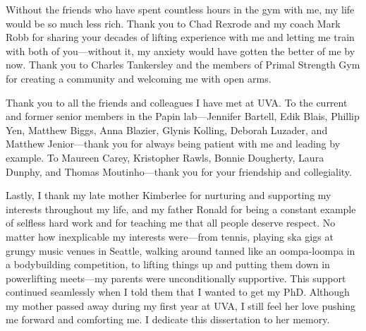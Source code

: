 \documentclass[11pt,onecolumn,notitlepage,openany,twoside]{book}
\begin{document}
Without the friends who have spent countless hours in the gym with me, my life would be so much less rich. Thank you to Chad Rexrode and my coach Mark Robb for sharing your decades of lifting experience with me and letting me train with both of you---without it, my anxiety would have gotten the better of me by now. Thank you to Charles Tankersley and the members of Primal Strength Gym for creating a community and welcoming me with open arms.

Thank you to all the friends and colleagues I have met at UVA. To the current and former senior members in the Papin lab---Jennifer Bartell, Edik Blais, Phillip Yen, Matthew Biggs, Anna Blazier, Glynis Kolling, Deborah Luzader, and Matthew Jenior---thank you for always being patient with me and leading by example. To Maureen Carey, Kristopher Rawls, Bonnie Dougherty, Laura Dunphy, and Thomas Moutinho---thank you for your friendship and collegiality.

Lastly, I thank my late mother Kimberlee for nurturing and supporting my interests throughout my life, and my father Ronald for being a constant example of selfless hard work and for teaching me that all people deserve respect. No matter how inexplicable my interests were---from tennis, playing ska gigs at grungy music venues in Seattle, walking around tanned like an oompa-loompa in a bodybuilding competition, to lifting things up and putting them down in powerlifting meets---my parents were unconditionally supportive. This support continued seamlessly when I told them that I wanted to get my PhD. Although my mother passed away during my first year at UVA, I still feel her love pushing me forward and comforting me. I dedicate this dissertation to her memory.

\mainmatter


\end{document}
